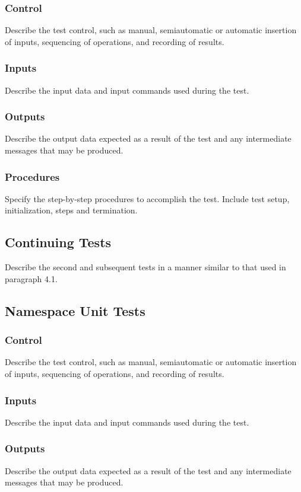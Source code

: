 \documentclass[11pt, oneside]{article}   	%
\begin{document}
\subsubsection{Control}
Describe the test control, such as manual, semiautomatic or automatic insertion of inputs, sequencing of operations, and recording of results.

\subsubsection{Inputs}
Describe the input data and input commands used during the test.

\subsubsection{Outputs}
Describe the output data expected as a result of the test and any intermediate messages that may be produced.

\subsubsection{Procedures}
Specify the step-by-step procedures to accomplish the test. Include test setup, initialization, steps and termination.

\subsection{Continuing Tests}
Describe the second and subsequent tests in a manner similar to that used in paragraph 4.1.

\subsection{Namespace Unit Tests}
\subsubsection{Control}
Describe the test control, such as manual, semiautomatic or automatic insertion of inputs, sequencing of operations, and recording of results.

\subsubsection{Inputs}
Describe the input data and input commands used during the test.

\subsubsection{Outputs}
Describe the output data expected as a result of the test and any intermediate messages that may be produced.
\end{document}
